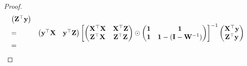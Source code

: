 \documentclass{amsart}[12pt]
\theoremstyle{definition}
\begin{document}
\begin{proof}
\begin{equation*}
\begin{array}{ll}
\begin{pmatrix}
			{\bf Z}^\top {\bf y}
			\end{pmatrix} \\
			=                                                                      &                                                                                                                                                                                                         
			\begin{pmatrix}
			{\bf y}^\top {\bf X}                                                           & {\bf y}^\top {\bf Z}                                                                                                                                                                                            
			\end{pmatrix}
			\begin{bmatrix}
			\begin{pmatrix}
			{\bf X}^\top {\bf X}                                                           & {\bf X}^\top {\bf Z}                                                                                                                                                                                            \\
			{\bf Z}^\top {\bf X}                                                           & {\bf Z}^\top {\bf Z}                                                                                                                                                                                            
			\end{pmatrix}
			\odot
			\begin{pmatrix}
			{\bf1}                                                                  & {\bf 1}                                                                                                                                                                                                   \\
			{\bf 1}                                                                  & {\bf 1} - ({\bf I} - {\bf W}^{-1})                                                                                                                                                                                
			\end{pmatrix}
			\end{bmatrix}
			^{-1}
			\begin{pmatrix}
			{\bf X}^\top {\bf y}\\
			{\bf Z}^\top {\bf y}
			\end{pmatrix} \\
			=                                                                      &                                                                                                                                                                                                         

\end{array}
\end{equation*}
\end{proof}
\end{document}
